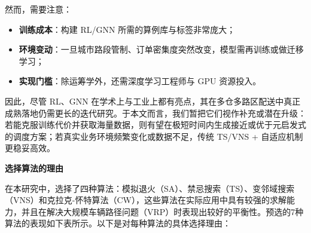 \documentclass[12pt,a4paper,twoside]{ctexbook}
\begin{document}
然而，需要注意：
\begin{itemize}
    \item \textbf{训练成本}：构建 RL/GNN 所需的算例库与标签非常庞大；
    \item \textbf{环境变动}：一旦城市路段管制、订单密集度突然改变，模型需再训练或做迁移学习；
    \item \textbf{实现门槛}：除运筹学外，还需深度学习工程师与 GPU 资源投入。
\end{itemize}

因此，尽管 RL、GNN 在学术上与工业上都有亮点，其在多仓多路区配送中真正成熟落地仍需更长的迭代研究。于本文而言，我们暂把它们视作补充或潜在升级：若能克服训练代价并获取海量数据，则有望在极短时间内生成接近或优于元启发式的调度方案；若真实业务环境频繁变化或数据不足，传统 TS/VNS + 自适应机制更稳妥高效。

\textbf{选择算法的理由}

在本研究中，选择了四种算法：模拟退火（SA）、禁忌搜索（TS）、变邻域搜索（VNS）和克拉克-怀特算法（CW），这些算法在实际应用中具有较强的求解能力，并且在解决大规模车辆路径问题（VRP）时表现出较好的平衡性。预选的7种算法的表现如下表所示。以下是对每种算法的具体选择理由：
\end{document}
